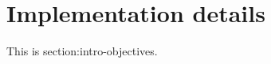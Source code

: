 \section{Implementation details}
\label{section:exp-implementation}

This is section:intro-objectives.